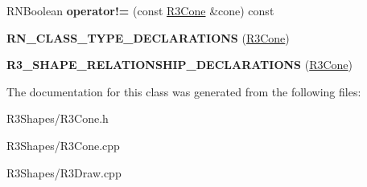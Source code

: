 \begin{DoxyCompactItemize}
\item 
R\+N\+Boolean {\bfseries operator!=} (const \hyperlink{class_r3_cone}{R3\+Cone} \&cone) const \hypertarget{class_r3_cone_ab1804af6cdd07425c2e4c45f73a01814}{}\label{class_r3_cone_ab1804af6cdd07425c2e4c45f73a01814}

\item 
{\bfseries R\+N\+\_\+\+C\+L\+A\+S\+S\+\_\+\+T\+Y\+P\+E\+\_\+\+D\+E\+C\+L\+A\+R\+A\+T\+I\+O\+NS} (\hyperlink{class_r3_cone}{R3\+Cone})\hypertarget{class_r3_cone_a3b15944433f541ec231912600913f6ee}{}\label{class_r3_cone_a3b15944433f541ec231912600913f6ee}

\item 
{\bfseries R3\+\_\+\+S\+H\+A\+P\+E\+\_\+\+R\+E\+L\+A\+T\+I\+O\+N\+S\+H\+I\+P\+\_\+\+D\+E\+C\+L\+A\+R\+A\+T\+I\+O\+NS} (\hyperlink{class_r3_cone}{R3\+Cone})\hypertarget{class_r3_cone_a768031b88b4c08289529c0d56e479c4a}{}\label{class_r3_cone_a768031b88b4c08289529c0d56e479c4a}

\end{DoxyCompactItemize}


The documentation for this class was generated from the following files\+:\begin{DoxyCompactItemize}
\item 
R3\+Shapes/R3\+Cone.\+h\item 
R3\+Shapes/R3\+Cone.\+cpp\item 
R3\+Shapes/R3\+Draw.\+cpp\end{DoxyCompactItemize}
